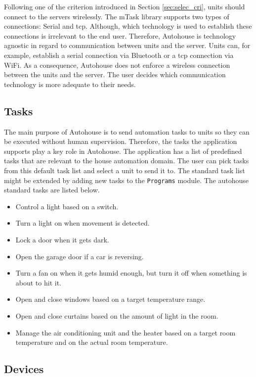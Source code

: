 Following one of the criterion introduced in Section \ref{sec:selec_cri}, units should connect to the servers wirelessly. The \gls{mTask} library supports two types of connections: Serial and \acs{tcp}. Although, which technology is used to establish these connections is irrelevant to the end user. Therefore, Autohouse is technology agnostic in regard to communication between units and the server. Units can, for example, establish a serial connection via Bluetooth or a \acs{tcp} connection via WiFi. As a consequence, Autohouse does not enforce a wireless connection between the units and the server. The user decides which communication technology is more adequate to their needs.

\subsection{Tasks}

The main purpose of Autohouse is to send automation tasks to units so they can be executed without human supervision. Therefore, the tasks the application supports play a key role in Autohouse. The application has a list of predefined tasks that are relevant to the house automation domain. The user can pick tasks from this default task list and select a unit to send it to. The standard task list might be extended by adding new tasks to the \texttt{Programs} module. The \gls{autohouse} standard tasks are listed below.

\begin{itemize}
    \item Control a light based on a switch. 
    \item Turn a light on when movement is detected.
    \item Lock a door when it gets dark.
    \item Open the garage door if a car is reversing.
    \item Turn a fan on when it gets humid enough, but turn it off when something is about to hit it.
    \item Open and close windows based on a target temperature range.
    \item Open and close curtains based on the amount of light in the room.
    \item Manage the air conditioning unit and the heater based on a target room temperature and on the actual room temperature.
\end{itemize}

\subsection{Devices}\label{sec:autohouse_devices}

